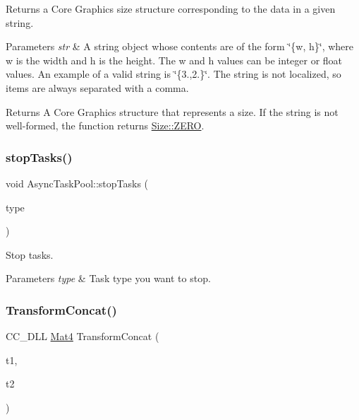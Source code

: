 Returns a Core Graphics size structure corresponding to the data in a given string. 


\begin{DoxyParams}{Parameters}
{\em str} & A string object whose contents are of the form \char`\"{}\{w, h\}\char`\"{}, where w is the width and h is the height. The w and h values can be integer or float values. An example of a valid string is \char`\"{}\{3.,2.\}\char`\"{}. The string is not localized, so items are always separated with a comma. \\
\hline
\end{DoxyParams}
\begin{DoxyReturn}{Returns}
A Core Graphics structure that represents a size. If the string is not well-\/formed, the function returns \hyperlink{classSize_a724334f12c8ef877c36b3f69e1257aa7}{Size\+::\+Z\+E\+RO}. 
\end{DoxyReturn}
\mbox{\label{group__base_gacb1c072daf35d81ddc62e1f40b61da29}} 
\subsubsection{\texorpdfstring{stop\+Tasks()}{stopTasks()}}
{\footnotesize\ttfamily void Async\+Task\+Pool\+::stop\+Tasks (\begin{DoxyParamCaption}\item[{Task\+Type}]{type }\end{DoxyParamCaption})\hspace{0.3cm}{\ttfamily [inline]}}

Stop tasks.


\begin{DoxyParams}{Parameters}
{\em type} & Task type you want to stop. \\
\hline
\end{DoxyParams}
\mbox{\label{group__base_gad02246e0b930697204afb7fb195b93b2}} 
\subsubsection{\texorpdfstring{Transform\+Concat()}{TransformConcat()}}
{\footnotesize\ttfamily C\+C\+\_\+\+D\+LL \hyperlink{classMat4}{Mat4} Transform\+Concat (\begin{DoxyParamCaption}\item[{const \hyperlink{classMat4}{Mat4} \&}]{t1,  }\item[{const \hyperlink{classMat4}{Mat4} \&}]{t2 }\end{DoxyParamCaption})}

